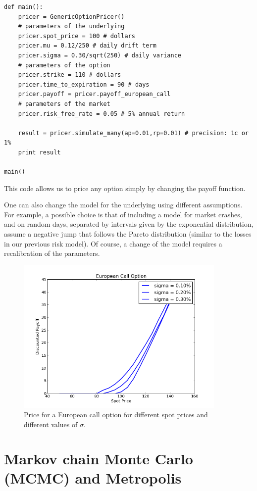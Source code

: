 \documentclass[justified,sixbynine]{tufte-book}
\def\ft{\small\tt}
\theoremstyle{plain}%
\theoremstyle{definition}
\theoremstyle{remark}
\begin{document}
\begin{fullwidth}
\begin{lstlisting}[caption={in file: {\ft options.py}}]
def main():
    pricer = GenericOptionPricer()
    # parameters of the underlying
    pricer.spot_price = 100 # dollars
    pricer.mu = 0.12/250 # daily drift term
    pricer.sigma = 0.30/sqrt(250) # daily variance
    # parameters of the option
    pricer.strike = 110 # dollars
    pricer.time_to_expiration = 90 # days
    pricer.payoff = pricer.payoff_european_call
    # parameters of the market
    pricer.risk_free_rate = 0.05 # 5% annual return

    result = pricer.simulate_many(ap=0.01,rp=0.01) # precision: 1c or 1%
    print result

main()
\end{lstlisting}

This code allows us to price any option simply by changing the payoff function.

One can also change the model for the underlying using different assumptions. For example, a possible choice is that of including a model for market crashes, and on random days, separated by intervals given by the exponential distribution, assume a negative jump that follows the Pareto distribution (similar to the losses in our previous risk model). Of course, a change of the model requires a recalibration of the parameters.

\begin{figure}[ht]
\centering\includegraphics[width=4in]{images/option.png}
\caption{Price for a European call option for different spot prices and different values of $\sigma$.\label{options}}
\end{figure}

\section{Markov chain Monte Carlo (MCMC) and Metropolis}


\end{fullwidth}
\end{document}
